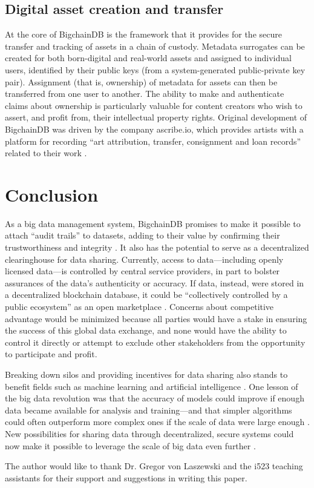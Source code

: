 \documentclass[sigconf]{acmart}
\begin{document}
\subsection{Digital asset creation and transfer}
At the core of BigchainDB is the framework that it provides for the secure transfer and tracking of assets in a chain of custody. Metadata surrogates can be created for both born-digital and real-world assets and assigned to individual users, identified by their public keys (from a system-generated public-private key pair). Assignment (that is, ownership) of metadata for assets can then be transferred from one user to another. The ability to make and authenticate claims about ownership is particularly valuable for content creators who wish to assert, and profit from, their intellectual property rights. Original development of BigchainDB was driven by the company ascribe.io, which provides artists with a platform for recording ``art attribution, transfer, consignment and loan records'' related to their work \cite{bigDB17a}.

\section{Conclusion}
As a big data management system, BigchainDB promises to make it possible to attach ``audit trails'' to datasets, adding to their value by confirming their trustworthiness and integrity \cite{tMBD16}. It also has the potential to serve as a decentralized clearinghouse for data sharing. Currently, access to data---including openly licensed data---is controlled by central service providers, in part to bolster assurances of the data's authenticity or accuracy. If data, instead, were stored in a decentralized blockchain database, it could be ``collectively controlled by a public ecosystem'' as an open marketplace \cite{tMBD16}. Concerns about competitive advantage would be minimized because all parties would have a stake in ensuring the success of this global data exchange, and none would have the ability to control it directly or attempt to exclude other stakeholders from the opportunity to participate and profit. 

Breaking down silos and providing incentives for data sharing also stands to benefit fields such as machine learning and artificial intelligence \cite{tMAI17}. One lesson of the big data revolution was that the accuracy of models could improve if enough data became available for analysis and training---and that simpler algorithms could often outperform more complex ones if the scale of data were large enough \cite{tMAI17}. New possibilities for sharing data through decentralized, secure systems could now make it possible to leverage the scale of big data even further \cite{tMAI17}.

\begin{acks}
The author would like to thank Dr. Gregor von Laszewski and the i523 teaching assistants for their support and suggestions in writing this paper.
\end{acks}


 
\end{document}
